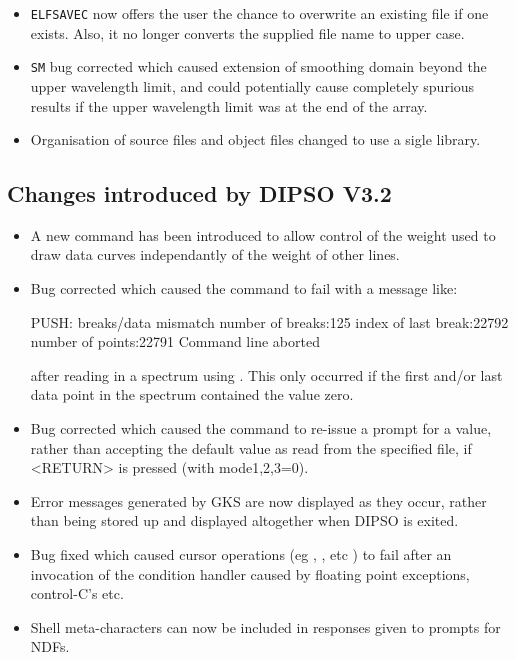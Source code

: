 \documentclass[twoside,11pt,noabs,nolof]{starlink}
\begin{document}
\begin{itemize}
\item \texttt{ELFSAVEC} now offers the user the chance to overwrite an
existing file if one exists. Also, it no longer converts the
supplied file name to upper case.

\item \texttt{SM} bug corrected which caused extension of smoothing domain
beyond the upper wavelength limit, and could potentially cause
completely spurious results if the upper wavelength limit was
at the end of the array.

\item Organisation of source files and object files changed to use a
sigle library.

\end{itemize}

\subsection{Changes introduced by DIPSO V3.2}
\begin{itemize}
\item A new command   has been introduced to allow control of the
weight used to draw data curves independantly of the weight of other
lines.

\item Bug corrected which caused the   command to fail with a message
like:

\begin{terminalv}
PUSH: breaks/data mismatch
number of breaks:125
index of last break:22792
number of points:22791
Command line aborted
\end{terminalv}

after reading in a spectrum using . This
only occurred if the first and/or last data point in the spectrum
contained the value zero.

\item Bug corrected which caused the   command to re-issue a prompt
for a value, rather than accepting the default value as read from the
specified file, if <RETURN> is pressed (with mode1,2,3=0).

\item Error messages generated by GKS are now displayed as they occur,
rather than being stored up and displayed altogether when DIPSO is
exited.

\item Bug fixed which caused cursor operations (eg ,  ,  etc ) to
fail after an invocation of the condition handler caused by floating
point exceptions, control-C's etc.

\item Shell meta-characters can now be included in responses given to
prompts for NDFs.

\end{itemize}
\end{document}
